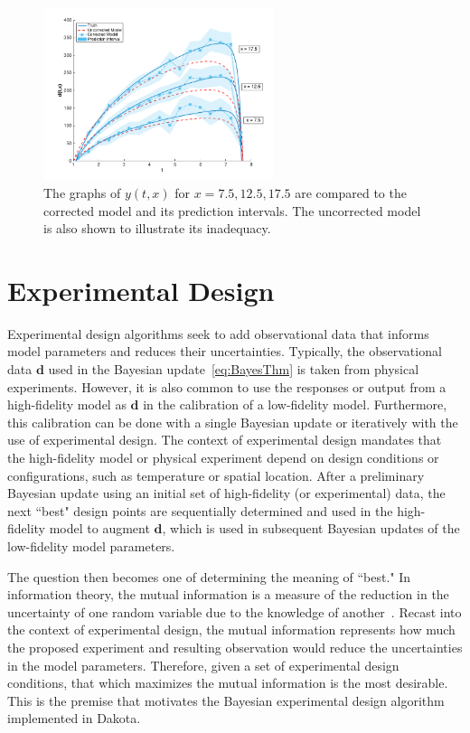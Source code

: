 \begin{figure}
\begin{center}
\includegraphics[width=0.6\textwidth]{images/moddiscrep_correctedlowmidhigh.png}
\end{center}
\label{fig:md_pred}
\vspace{-0.5cm}
\caption{The graphs of $y(t,x)$ for $x = 7.5, 12.5, 17.5$ are compared to the corrected model and its prediction intervals. The uncorrected model is also shown to illustrate its inadequacy.}
\end{figure}
 
\section{Experimental Design}
\label{uq:bayes_experimental_design}

Experimental design algorithms seek to add observational data that informs
model parameters and reduces their uncertainties. Typically, the observational 
data $\boldsymbol{d}$ used in the Bayesian update~\ref{eq:BayesThm} is taken
from physical experiments. However, it is also common to use the responses or
output from a high-fidelity model as $\boldsymbol{d}$ in the calibration of a
low-fidelity model. Furthermore, this calibration can be done with a single
Bayesian update or iteratively with the use of experimental design. The context
of experimental design mandates that the high-fidelity model or physical 
experiment depend on design conditions or configurations, such as temperature
or spatial location. After a preliminary Bayesian update using an initial set 
of high-fidelity (or experimental) data, the next ``best" design points are 
sequentially determined and used in the high-fidelity model to augment 
$\boldsymbol{d}$, which is used in subsequent Bayesian updates of the 
low-fidelity model parameters.

The question then becomes one of determining the meaning of ``best." In 
information theory, the mutual information is a measure of the reduction in the 
uncertainty of one random variable due to the knowledge of 
another~\cite{Cov2006}. Recast into the context of experimental design, the 
mutual information represents how much the proposed experiment and resulting 
observation would reduce the uncertainties in the model parameters. Therefore, 
given a set of experimental design conditions, that which maximizes the mutual 
information is the most desirable. This is the premise that motivates the 
Bayesian experimental design algorithm implemented in Dakota.


